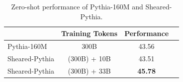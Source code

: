 \begin{table}[h]
    \centering
    \caption{{Zero-shot performance of Pythia-160M and Sheared-Pythia.}}
    \begin{tabular}{@{}lccc@{}}
    \toprule
                   & Training Tokens & Performance \\ \midrule
    Pythia-160M    &        300B                     & 43.56       \\
    Sheared-Pythia &        (300B) + 10B                    & 43.51       \\
    Sheared-Pythia &        (300B) + 33B                   & \textbf{45.78}       \\ \bottomrule
    \end{tabular}
    \label{tab:pythia}
\end{table}